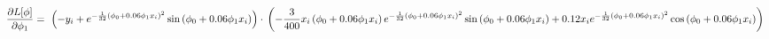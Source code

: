\documentclass{article}
\begin{document}
\begin{dmath*}
    \frac{\partial{L[\phi]}}{\partial{\phi_1}} = \
    \left(- y_{i} + e^{- \frac{1}{32} \left(\phi_{0} + 0.06 \phi_{1} x_{i}\right)^{2}} \sin{\left(\phi_{0} + 0.06 \phi_{1} x_{i} \right)}\right) \cdot \newline \left(- \frac{3}{400} x_{i} \left(\phi_{0} + 0.06 \phi_{1} x_{i}\right) e^{- \frac{1}{32} \left(\phi_{0} + 0.06 \phi_{1} x_{i}\right)^{2}} \sin{\left(\phi_{0} + 0.06 \phi_{1} x_{i} \right)} + 0.12 x_{i} e^{- \frac{1}{32} \left(\phi_{0} + 0.06 \phi_{1} x_{i}\right)^{2}} \cos{\left(\phi_{0} + 0.06 \phi_{1} x_{i} \right)}\right)
\end{dmath*}
\end{document}
